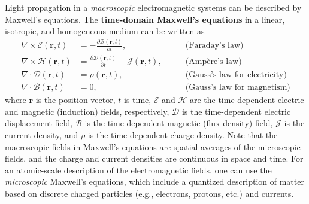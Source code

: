 Light propagation in a \emph{macroscopic} electromagnetic systems can be
described by Maxwell's equations. The \textbf{time-domain Maxwell's
equations} in a linear, isotropic, and homogeneous medium can be written as~\cite{maxwell1873,novotny}
\begin{align}
    \nabla \times \bm{\mathcal{E}} (\mathbf{r},t)            & = - \frac{\partial
    \bm{\mathcal{B}}(\mathbf{r},t)}{\partial t}, \quad \quad & \text{(Faraday's
    law)} \label{eq:faraday}                                                                                         \\
    \nabla \times \bm{\mathcal{H}} (\mathbf{r},t)            & = \frac{\partial
        \bm{\mathcal{D}}(\mathbf{r},t)}{\partial t} + \bm{\mathcal{J}}(\mathbf{r},t),
    \quad \quad                                              & \text{(Ampère's law)} \label{eq:ampere}               \\
    \nabla \cdot \bm{\mathcal{D}} (\mathbf{r},t)             & =
    \mathcal{\rho}(\mathbf{r},t), \quad \quad                & \text{(Gauss's law for electricity)}
    \label{eq:gauss_E}                                                                                               \\
    \nabla \cdot \bm{\mathcal{B}} (\mathbf{r},t)             & = 0, \quad \quad
                                                             & \text{(Gauss's law for magnetism)} \label{eq:Gauss_B}
\end{align}
where $\mathbf{r}$ is the position vector, $t$ is time, $\bm{\mathcal{E}}$ and $\bm{\mathcal{H}}$ are the time-dependent electric
and magnetic (induction) fields, respectively,
$\bm{\mathcal{D}}$ is the time-dependent electric displacement field,
$\bm{\mathcal{B}}$ is the time-dependent magnetic (flux-density) field,
$\bm{\mathcal{J}}$ is the current density,
and $\mathcal{\rho}$ is the time-dependent charge density. %
Note that the macroscopic fields in Maxwell's equations
are spatial averages of the
microscopic fields, and the charge and current densities are continuous in space
and time.
For an atomic-scale description of the electromagnetic fields, one can use the
\emph{microscopic}
Maxwell's equations, which include a quantized description of matter based on
discrete charged particles
(e.g., electrons, protons, etc.) and currents.

